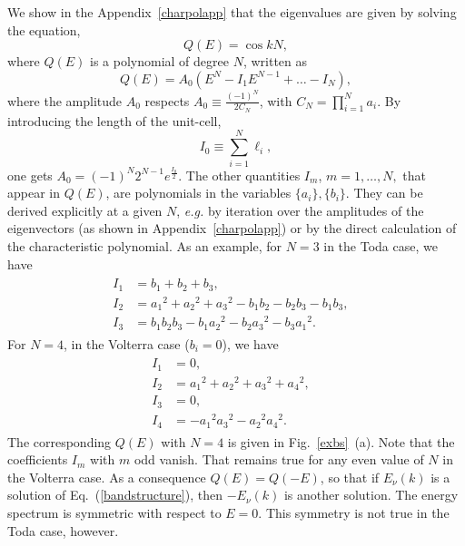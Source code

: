 \documentclass[]{revtex4-1}
\begin{document}
We show in the Appendix~\ref{charpolapp} that the eigenvalues are given by solving the equation,
\begin{equation}
Q(E)=\cos kN,
 \label{bandstructure}  \end{equation}
where $Q(E)$ is a polynomial of degree $N$, written as
\begin{equation}
Q(E)= A_0 \left( E^N-I_1 E^{N-1} + \dots -I_N \right), \label{QE}
\end{equation}
where the amplitude $A_0$ respects $A_0 \equiv \frac{(-1)^N}{2C_N}$, with $C_N = \prod_{i=1}^N a_i$.
By introducing the length of the unit-cell,
\begin{equation}
  I_0 \equiv \sum_{i=1}^{N} \ell_i, \label{I0def}
\end{equation}
one gets $A_0= (-1)^N 2^{N-1} e^{\frac{I_0}{2}}$.
The other quantities $I_m$, $m=1,\dots,N,$ that appear in $Q(E)$, are polynomials in the variables $\{a_i\},\{b_i\}$.
They can be derived explicitly at a given $N$, \textit{e.g.} by iteration over the amplitudes of the eigenvectors (as shown in Appendix~\ref{charpolapp}) or by the direct calculation of the characteristic polynomial. As an example, for $N=3$ in the Toda case, we have
\begin{eqnarray}
  \begin{aligned}
  I_1 &= b_1+b_2+b_3, & \\ %
  I_2 &= {a_1}^2+{a_2}^2+{a_3}^2-b_1b_2-b_2b_3-b_1b_3, & \\ %
  I_3 &= b_1b_2b_3 -b_1{a_2}^2 -b_2{a_3}^2 -b_3{a_1}^2. & \label{i3}
  \end{aligned}
\end{eqnarray}
For $N=4$, in the Volterra case ($b_i=0$), we have
\begin{eqnarray}
    \begin{aligned}
  I_1 &= 0, & \\ %
  I_2 &= {a_1}^2+{a_2}^2+{a_3}^2+{a_4}^2, & \\%
  I_3 &= 0, & \\ %
  I_4 &=  -{a_1}^2{a_3}^2-{a_2}^2{a_4}^2. & \label{i4N4} 
\end{aligned}  \end{eqnarray} 
The corresponding $Q(E)$ with $N=4$ is given in Fig.~\ref{exbs}~(a).
Note that the coefficients $I_m$ with $m$ odd vanish. That remains true for any even value of $N$ in the Volterra case. As a consequence $Q(E)=Q(-E)$, so that if $E_{\nu}(k)$ is a solution of Eq.~(\ref{bandstructure}), then $-E_{\nu}(k)$ is another solution. The energy spectrum is symmetric with respect to $E=0$. This symmetry is not true in the Toda case, however. 
\end{document}
